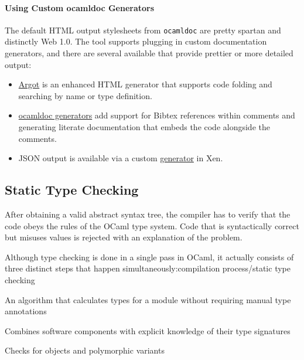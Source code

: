 \hypertarget{using-custom-ocamldoc-generators}{%
\paragraph{Using Custom ocamldoc
Generators}\label{using-custom-ocamldoc-generators}}

The default HTML output stylesheets from
\passthrough{\lstinline!ocamldoc!} are pretty spartan and distinctly Web
1.0. The tool supports plugging in custom documentation generators, and
there are several available that provide prettier or more detailed
output:

\begin{itemize}
\item
  \href{http://argot.x9c.fr/}{Argot} is an enhanced HTML generator that
  supports code folding and searching by name or type definition.
\item
  \href{https://gitorious.org/ocamldoc-generators/ocamldoc-generators}{ocamldoc
  generators} add support for Bibtex references within comments and
  generating literate documentation that embeds the code alongside the
  comments.
\item
  JSON output is available via a custom
  \href{https://github.com/xen-org/ocamldoc-json}{generator} in Xen.
\end{itemize}

\hypertarget{static-type-checking}{%
\subsection{Static Type Checking}\label{static-type-checking}}

After obtaining a valid abstract syntax tree, the compiler has to verify
that the code obeys the rules of the OCaml type system. Code that is
syntactically correct but misuses values is rejected with an explanation
of the problem.

Although type checking is done in a single pass in OCaml, it actually
consists of three distinct steps that happen
simultaneously:\protect\hypertarget{CPstatictype}{}{compilation
process/static type checking}

\begin{description}
\tightlist
\item[automatic type inference]
An algorithm that calculates types for a module without requiring manual
type annotations
\item[module system]
Combines software components with explicit knowledge of their type
signatures
\item[explicit subtyping]
Checks for objects and polymorphic variants
\end{description}

